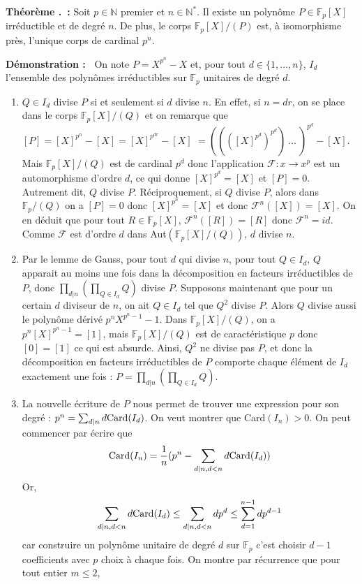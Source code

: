 \documentclass[5pt,a4paper]{article}
\newcounter{thmcounter}[subsection]
\renewcommand{\thethmcounter}{\thesubsection.\arabic{thmcounter}}
\newcommand{\thm}[1]{
    \stepcounter{thmcounter}
    \hypertarget{t:\thethmcounter}{}%
    \noindent\textbf{Théorème \thethmcounter ~:} #1 \newline
}
\newcommand{\demoEnum}[1]{
    \textbf{Démonstration :~} #1
}
\begin{document}
\begin{onehalfspacing}
\thm{Soit $p \in \mathbb{N}$ premier et $n \in \mathbb{N}^{*}$. Il existe un polynôme $P \in \mathbb{F}_p[X]$ irréductible et de degré $n$. De plus, le corps $\mathbb{F}_p[X]/(P)$ est, à isomorphisme près, l'unique corps de cardinal $p^n$.}
\demoEnum{On note $P = X^{p^n} - X$ et, pour tout $d \in \{1, ..., n\}$, $I_d$ l'ensemble des polynômes irréductibles sur $\mathbb{F}_p$ unitaires de degré $d$.
	\begin{enumerate}
	\item $Q \in I_d$ divise $P$ si et seulement si $d$ divise $n$. En effet, si $n = dr$, on se place dans le corps $\mathbb{F}_p[X]/(Q)$ et on remarque que $[P] = [X]^{p^n} - [X] = [X]^{p^{dr}} - [X]$ $= ((([X]^{p^d})^{p^d})~...~)^{p^d} - [X]$. Mais $\mathbb{F}_p[X]/(Q)$ est de cardinal $p^d$ donc l'application $\mathcal{F} : x \rightarrow x^p$ est un automorphisme d'ordre $d$, ce qui donne $[X]^{p^d} = [X]$ et $[P] = 0$. Autrement dit, $Q$ divise $P$. Réciproquement, si $Q$ divise $P$, alors dans $\mathbb{F}_p/(Q)$ on a $[P] = 0$ donc $[X]^{p^n} = [X]$ et donc $\mathcal{F}^n([X]) = [X]$. On en déduit que pour tout $R \in \mathbb{F}_p[X]$, $\mathcal{F}^n([R]) = [R]$ donc $\mathcal{F}^n = id$. Comme $\mathcal{F}$ est d'ordre $d$ dans Aut$(\mathbb{F}_p[X]/(Q))$, $d$ divise $n$.
	\item Par le lemme de Gauss, pour tout $d$ qui divise $n$, pour tout $Q \in I_d$, $Q$ apparait au moins une fois dans la décomposition en facteurs irréductibles de $P$, donc  $\prod_{d|n}(\prod_{Q \in I_d}Q)$ divise $P$. Supposons maintenant que pour un certain $d$ diviseur de $n$, on ait $Q \in I_d$ tel que $Q^2$ divise $P$. Alors $Q$ divise aussi le polynôme dérivé $p^nX^{p^n - 1} - 1$. Dans $\mathbb{F}_p[X]/(Q)$, on a $p^n[X]^{p^n - 1} = [1]$, mais $\mathbb{F}_p[X]/(Q)$ est de caractéristique $p$ donc $[0] = [1]$ ce qui est absurde. Ainsi, $Q^2$ ne divise pas $P$, et donc la décomposition en facteurs irréductibles de $P$ comporte chaque élément de $I_d$ exactement une fois : $P = \prod_{d|n}(\prod_{Q \in I_d}Q)$.
	\item La nouvelle écriture de $P$ nous permet de trouver une expression pour son degré : $p^n = \sum_{d|n}d\textup{Card}(I_d)$. On veut montrer que Card$(I_n) > 0$. On peut commencer par écrire que 
\[\textup{Card}(I_n) = \frac{1}{n}(p^n - \sum_{d|n, d < n}d\textup{Card}(I_d))\]
Or,
\[\sum_{d|n, d < n}d\textup{Card}(I_d) \leq \sum_{d|n, d < n}dp^d \leq \sum_{d=1}^{n-1}dp^{d-1}\]
car construire un polynôme unitaire de degré $d$ sur $\mathbb{F}_p$ c'est choisir $d-1$ coefficients avec $p$ choix à chaque fois. On montre par récurrence que pour tout entier $m \leq 2$,

\end{enumerate}}
\end{onehalfspacing}
\end{document}
